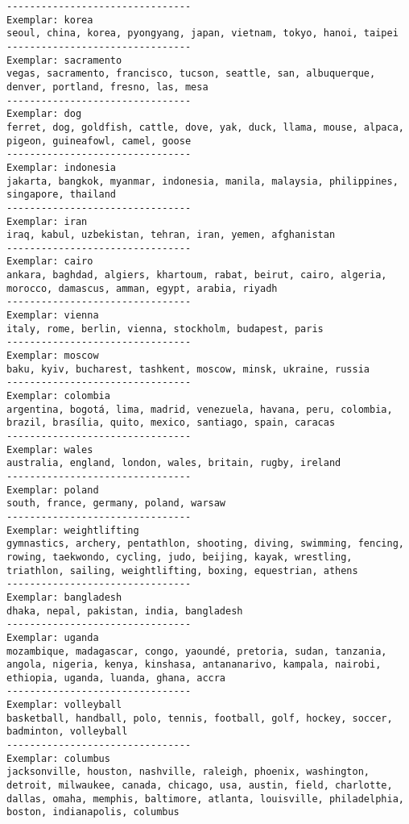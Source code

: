 \documentclass[11pt]{article}
\begin{document}
    \begin{Verbatim}[commandchars=\\\{\}]
--------------------------------
Exemplar: korea
seoul, china, korea, pyongyang, japan, vietnam, tokyo, hanoi, taipei
--------------------------------
Exemplar: sacramento
vegas, sacramento, francisco, tucson, seattle, san, albuquerque, denver, portland, fresno, las, mesa
--------------------------------
Exemplar: dog
ferret, dog, goldfish, cattle, dove, yak, duck, llama, mouse, alpaca, pigeon, guineafowl, camel, goose
--------------------------------
Exemplar: indonesia
jakarta, bangkok, myanmar, indonesia, manila, malaysia, philippines, singapore, thailand
--------------------------------
Exemplar: iran
iraq, kabul, uzbekistan, tehran, iran, yemen, afghanistan
--------------------------------
Exemplar: cairo
ankara, baghdad, algiers, khartoum, rabat, beirut, cairo, algeria, morocco, damascus, amman, egypt, arabia, riyadh
--------------------------------
Exemplar: vienna
italy, rome, berlin, vienna, stockholm, budapest, paris
--------------------------------
Exemplar: moscow
baku, kyiv, bucharest, tashkent, moscow, minsk, ukraine, russia
--------------------------------
Exemplar: colombia
argentina, bogotá, lima, madrid, venezuela, havana, peru, colombia, brazil, brasília, quito, mexico, santiago, spain, caracas
--------------------------------
Exemplar: wales
australia, england, london, wales, britain, rugby, ireland
--------------------------------
Exemplar: poland
south, france, germany, poland, warsaw
--------------------------------
Exemplar: weightlifting
gymnastics, archery, pentathlon, shooting, diving, swimming, fencing, rowing, taekwondo, cycling, judo, beijing, kayak, wrestling, triathlon, sailing, weightlifting, boxing, equestrian, athens
--------------------------------
Exemplar: bangladesh
dhaka, nepal, pakistan, india, bangladesh
--------------------------------
Exemplar: uganda
mozambique, madagascar, congo, yaoundé, pretoria, sudan, tanzania, angola, nigeria, kenya, kinshasa, antananarivo, kampala, nairobi, ethiopia, uganda, luanda, ghana, accra
--------------------------------
Exemplar: volleyball
basketball, handball, polo, tennis, football, golf, hockey, soccer, badminton, volleyball
--------------------------------
Exemplar: columbus
jacksonville, houston, nashville, raleigh, phoenix, washington, detroit, milwaukee, canada, chicago, usa, austin, field, charlotte, dallas, omaha, memphis, baltimore, atlanta, louisville, philadelphia, boston, indianapolis, columbus

    \end{Verbatim}


    
    
    
    
\end{document}
